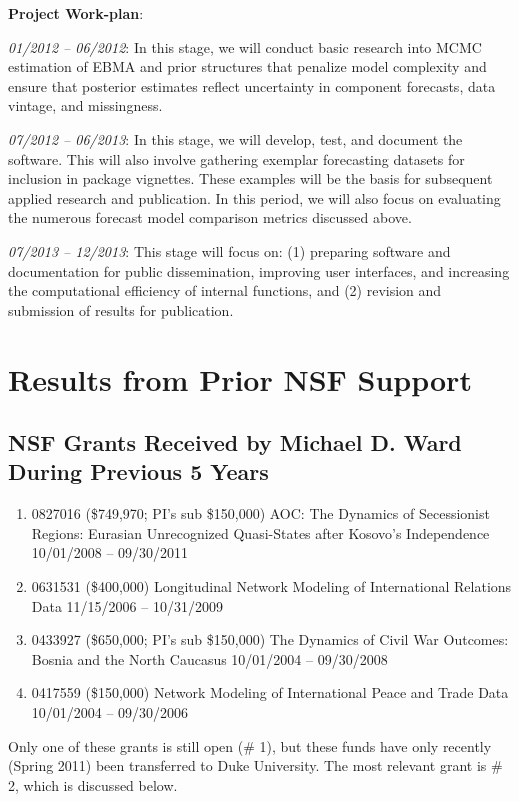 \documentclass[pdftex,12pt,fullpage,oneside]{amsart}
\begin{document}
\newpage\textbf{Project Work-plan}:

\noindent \textit{01/2012 -- 06/2012}: In this stage, we will conduct
basic research into MCMC estimation of EBMA and prior structures that
penalize model complexity and ensure that posterior estimates reflect
uncertainty in component forecasts, data vintage, and missingness.

\noindent \textit{07/2012 -- 06/2013}: In this stage, we will develop,
test, and document the software. This will also involve gathering
exemplar forecasting datasets for inclusion in package vignettes.
These examples will be the basis for subsequent applied research and
publication.  In this period, we will also focus on evaluating the
numerous forecast model comparison metrics discussed above.

\noindent \textit{07/2013 -- 12/2013}: This stage will focus on: (1)
preparing software and documentation for public dissemination,
improving user interfaces, and increasing the computational efficiency
of internal functions, and (2) revision and submission of results for
publication.



\section{Results from Prior NSF Support}


\subsection{NSF Grants Received by Michael D. Ward During Previous 5 Years}

\begin{enumerate}

\item 0827016 (\$749,970; PI's sub \$150,000) AOC: The Dynamics of
  Secessionist Regions: Eurasian Unrecognized Quasi-States after
  Kosovo's Independence 10/01/2008 -- 09/30/2011

\item 0631531 (\$400,000) Longitudinal Network Modeling of
  International Relations Data 11/15/2006 -- 10/31/2009

\item 0433927 (\$650,000; PI's sub \$150,000) The Dynamics of Civil
  War Outcomes: Bosnia and the North Caucasus 10/01/2004 -- 09/30/2008

\item 0417559 (\$150,000) Network Modeling of International Peace and
  Trade Data 10/01/2004 -- 09/30/2006

\end{enumerate}  Only one of these grants is still open (\# 1), but these funds have
only recently (Spring 2011) been transferred to Duke University. The
most relevant grant is \# 2, which is discussed below. \vspace{.1in}
\end{document}
